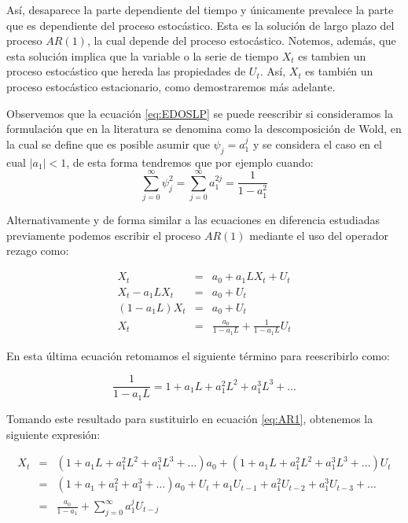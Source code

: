 \documentclass[
]{book}
\begin{document}
Así, desaparece la parte dependiente del tiempo y únicamente prevalece
la parte que es dependiente del proceso estocástico. Esta es la solución
de largo plazo del proceso \(AR(1)\), la cual depende del proceso
estocástico. Notemos, además, que esta solución implica que la variable
o la serie de tiempo \(X_t\) es tambien un proceso estocástico que hereda
las propiedades de \(U_t\). Así, \(X_t\) es también un proceso estocástico
estacionario, como demostraremos más adelante.

Observemos que la ecuación \eqref{eq:EDOSLP} se puede reescribir si
consideramos la formulación que en la literatura se denomina como la
descomposición de Wold, en la cual se define que es posible asumir que
\(\psi_j = a_1^j\) y se considera el caso en el cual
\(\lvert a_1 \lvert< 1\), de esta forma tendremos que por ejemplo cuando:
\begin{equation*}
    \sum^{\infty}_{j = 0} \psi^2_j = \sum^{\infty}_{j = 0} a_1^{2j} = \frac{1}{1 - a_1^2} 
\end{equation*}

Alternativamente y de forma similar a las ecuaciones en diferencia
estudiadas previamente podemos escribir el proceso \(AR(1)\) mediante el
uso del operador rezago como:

\begin{eqnarray}
    X_t & = & a_0 + a_1 L X_t + U_t \nonumber \\
    X_t - a_1 L X_t & = & a_0 + U_t \nonumber \\
    (1 - a_1 L) X_t & = & a_0 + U_t \nonumber \\
    X_t & = & \frac{a_0}{1 - a_1 L} + \frac{1}{1 - a_1 L} U_t
    \label{eq:AR1}
\end{eqnarray}

En esta última ecuación retomamos el siguiente término para reescribirlo
como:

\begin{equation}
    \frac{1}{1 - a_1 L} = 1 + a_1 L + a_1^2 L^2 + a_1^3 L^3 + \ldots
    \label{eq:AR2}
\end{equation}

Tomando este resultado para sustituirlo en ecuación \eqref{eq:AR1},
obtenemos la siguiente expresión:

\begin{eqnarray}
X_t & = & (1 + a_1 L + a_1^2 L^2 + a_1^3 L^3 + \ldots) a_0 + (1 + a_1 L + a_1^2 L^2 + a_1^3 L^3 + \ldots) U_t \nonumber \\
    & = & (1 + a_1 + a_1^2 + a_1^3 + \ldots) a_0 + U_t + a_1 U_{t-1} + a_1^2 U_{t-2} + a_1^3 U_{t-3} + \ldots \nonumber \\
    & = & \frac{a_0}{1 - a_1} + \sum^{\infty}_{j = 0} a_1^j U_{t-j}
    \label{eq:AR1Sol}
\end{eqnarray}
\end{document}
